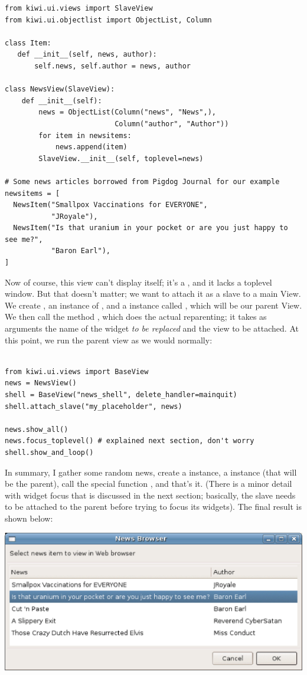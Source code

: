 \documentclass[a4paper]{howto}
\begin{document}
\begin{verbatim}
from kiwi.ui.views import SlaveView
from kiwi.ui.objectlist import ObjectList, Column

class Item:
   def __init__(self, news, author):
       self.news, self.author = news, author

class NewsView(SlaveView):
    def __init__(self):
        news = ObjectList(Column("news", "News",),
                          Column("author", "Author"))
        for item in newsitems:
            news.append(item)
        SlaveView.__init__(self, toplevel=news)

# Some news articles borrowed from Pigdog Journal for our example
newsitems = [
  NewsItem("Smallpox Vaccinations for EVERYONE",
           "JRoyale"),
  NewsItem("Is that uranium in your pocket or are you just happy to see me?",
           "Baron Earl"),
]

\end{verbatim}

Now of course, this view can't display itself; it's a ,
and it lacks a toplevel window. But that doesn't matter; we want to
attach it as a slave to a main View. We create , an instance
of , and a  instance called
, which will be our parent View. We then call the method
, which does the actual reparenting; it takes as
arguments the name of the widget {\it to be replaced} and the view to be
attached. At this point, we run the parent view as we would normally:

\begin{verbatim}

from kiwi.ui.views import BaseView
news = NewsView()
shell = BaseView("news_shell", delete_handler=mainquit)
shell.attach_slave("my_placeholder", news)

news.show_all()
news.focus_toplevel() # explained next section, don't worry
shell.show_and_loop()
\end{verbatim}

In summary, I gather some random news, create a 
instance, a  instance (that will be the parent), call
the special function , and that's it. (There is a
minor detail with widget focus that is discussed in the next section;
basically, the slave needs to be attached to the parent before trying to
focus its widgets).  The final result is shown below:

\begin{center}
\includegraphics[scale=0.905]{images/shell2.eps}
\end{center}
\end{document}
